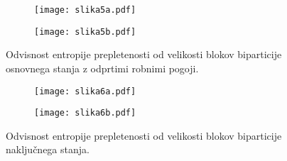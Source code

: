 \documentclass[a4paper]{article}
\begin{document}
    \begin{figure}
        \centering
        \begin{subfigure}{\textwidth}
            \texttt{[image: slika5a.pdf]}
        \end{subfigure}
        \begin{subfigure}{\textwidth}
            \texttt{[image: slika5b.pdf]}
        \end{subfigure}
        \caption{Odvisnost entropije prepletenosti od velikosti blokov biparticije osnovnega stanja z odprtimi robnimi pogoji.}
        \label{slika5}
    \end{figure}

    \begin{figure}
        \centering
        \begin{subfigure}{\textwidth}
            \texttt{[image: slika6a.pdf]}
        \end{subfigure}
        \begin{subfigure}{\textwidth}
            \texttt{[image: slika6b.pdf]}
        \end{subfigure}
        \caption{Odvisnost entropije prepletenosti od velikosti blokov biparticije naključnega stanja.}
        \label{slika6}
    \end{figure}
\end{document}
